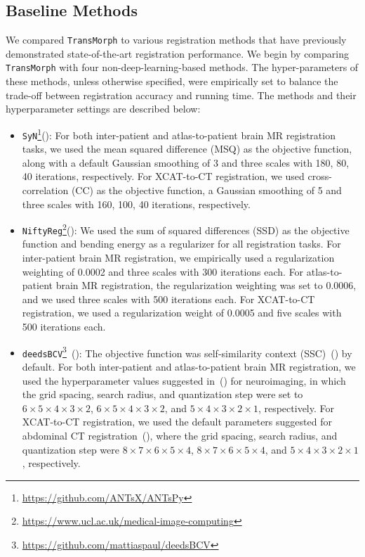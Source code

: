 \documentclass[times,twocolumn,final]{elsarticle}
\begin{document}
\subsection{Baseline Methods}
We compared \texttt{TransMorph} to various registration methods that have previously demonstrated state-of-the-art registration performance. We begin by comparing \texttt{TransMorph} with four non-deep-learning-based methods. The hyper-parameters of these methods, unless otherwise specified, were empirically set to balance the trade-off between registration accuracy and running time. The methods and their hyperparameter settings are described below: 
\begin{itemize}[noitemsep]
    \item \texttt{SyN}\footnote{\url{https://github.com/ANTsX/ANTsPy}}(\cite{avants2008symmetric}): For both inter-patient and atlas-to-patient brain MR registration tasks, we used the mean squared difference (MSQ) as the objective function, along with a default Gaussian smoothing of 3 and three scales with 180, 80, 40 iterations, respectively. For XCAT-to-CT registration, we used cross-correlation (CC) as the objective function, a Gaussian smoothing of 5 and three scales with 160, 100, 40 iterations, respectively.
    \item \texttt{NiftyReg}\footnote{\url{https://www.ucl.ac.uk/medical-image-computing}}(\cite{modat2010fast}): We used the sum of squared differences (SSD) as the objective function and bending energy as a regularizer for all registration tasks. For inter-patient brain MR registration, we empirically used a regularization weighting of 0.0002 and three scales with 300 iterations each. For atlas-to-patient brain MR registration, the regularization weighting was set to 0.0006, and we used three scales with 500 iterations each. For XCAT-to-CT registration, we used a regularization weight of 0.0005 and five scales with 500 iterations each.
    \item \texttt{deedsBCV}\footnote{\url{https://github.com/mattiaspaul/deedsBCV}}~(\cite{heinrich2015multi}): The objective function was self-similarity context (SSC)~(\cite{heinrich2013towards}) by default. For both inter-patient and atlas-to-patient brain MR registration, we used the hyperparameter values suggested in~(\cite{hoffmann2020learning}) for neuroimaging, in which the grid spacing, search radius, and quantization step were set to $6\times5\times4\times3\times2$, $6\times5\times4\times3\times2$, and $5\times4\times3\times2\times1$, respectively. For XCAT-to-CT registration, we used the default parameters suggested for abdominal CT registration~(\cite{heinrich2015multi}), where the grid spacing, search radius, and quantization step were $8\times7\times6\times5\times4$, $8\times7\times6\times5\times4$, and $5\times4\times3\times2\times1$, respectively.

\end{itemize}
\end{document}
